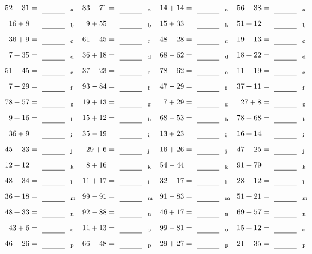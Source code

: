 \documentclass
[
  draft    = true,
  fontsize = 11pt,
  parskip  = half-
]
{scrartcl}
\begin{document}
\clearpage
\begin{align*}
    \pline{52-31}&=\rline{a}
  & \pline{83-71}&=\rline{a}
  & \pline{14+14}&=\rline{a}
  & \pline{56-38}&=\rline{a} \\[1ex]
    \pline{16+8}&=\rline{b}
  & \pline{9+55}&=\rline{b}
  & \pline{15+33}&=\rline{b}
  & \pline{51+12}&=\rline{b} \\[1ex]
    \pline{36+9}&=\rline{c}
  & \pline{61-45}&=\rline{c}
  & \pline{48-28}&=\rline{c}
  & \pline{19+13}&=\rline{c} \\[1ex]
    \pline{7+35}&=\rline{d}
  & \pline{36+18}&=\rline{d}
  & \pline{68-62}&=\rline{d}
  & \pline{18+22}&=\rline{d} \\[1ex]
    \pline{51-45}&=\rline{e}
  & \pline{37-23}&=\rline{e}
  & \pline{78-62}&=\rline{e}
  & \pline{11+19}&=\rline{e} \\[1ex]
    \pline{7+29}&=\rline{f}
  & \pline{93-84}&=\rline{f}
  & \pline{47-29}&=\rline{f}
  & \pline{37+11}&=\rline{f} \\[1ex]
    \pline{78-57}&=\rline{g}
  & \pline{19+13}&=\rline{g}
  & \pline{7+29}&=\rline{g}
  & \pline{27+8}&=\rline{g} \\[1ex]
    \pline{9+16}&=\rline{h}
  & \pline{15+12}&=\rline{h}
  & \pline{68-53}&=\rline{h}
  & \pline{78-68}&=\rline{h} \\[1ex]
    \pline{36+9}&=\rline{i}
  & \pline{35-19}&=\rline{i}
  & \pline{13+23}&=\rline{i}
  & \pline{16+14}&=\rline{i} \\[1ex]
    \pline{45-33}&=\rline{j}
  & \pline{29+6}&=\rline{j}
  & \pline{16+26}&=\rline{j}
  & \pline{47+25}&=\rline{j} \\[1ex]
    \pline{12+12}&=\rline{k}
  & \pline{8+16}&=\rline{k}
  & \pline{54-44}&=\rline{k}
  & \pline{91-79}&=\rline{k} \\[1ex]
    \pline{48-34}&=\rline{l}
  & \pline{11+17}&=\rline{l}
  & \pline{32-17}&=\rline{l}
  & \pline{28+12}&=\rline{l} \\[1ex]
    \pline{36+18}&=\rline{m}
  & \pline{99-91}&=\rline{m}
  & \pline{91-83}&=\rline{m}
  & \pline{51+21}&=\rline{m} \\[1ex]
    \pline{48+33}&=\rline{n}
  & \pline{92-88}&=\rline{n}
  & \pline{46+17}&=\rline{n}
  & \pline{69-57}&=\rline{n} \\[1ex]
    \pline{43+6}&=\rline{o}
  & \pline{11+13}&=\rline{o}
  & \pline{99-81}&=\rline{o}
  & \pline{15+12}&=\rline{o} \\[1ex]
    \pline{46-26}&=\rline{p}
  & \pline{66-48}&=\rline{p}
  & \pline{29+27}&=\rline{p}
  & \pline{21+35}&=\rline{p}
\end{align*}
\end{document}
